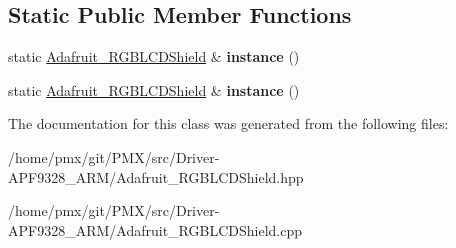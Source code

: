 \subsection*{Static Public Member Functions}
\begin{DoxyCompactItemize}
\item 
\mbox{\label{classAdafruit__RGBLCDShield_a5d6b24992e72f3beb5187b971eec3d42}} 
static \hyperlink{classAdafruit__RGBLCDShield}{Adafruit\+\_\+\+R\+G\+B\+L\+C\+D\+Shield} \& {\bfseries instance} ()
\item 
\mbox{\label{classAdafruit__RGBLCDShield_a5d6b24992e72f3beb5187b971eec3d42}} 
static \hyperlink{classAdafruit__RGBLCDShield}{Adafruit\+\_\+\+R\+G\+B\+L\+C\+D\+Shield} \& {\bfseries instance} ()
\end{DoxyCompactItemize}


The documentation for this class was generated from the following files\+:\begin{DoxyCompactItemize}
\item 
/home/pmx/git/\+P\+M\+X/src/\+Driver-\/\+A\+P\+F9328\+\_\+\+A\+R\+M/Adafruit\+\_\+\+R\+G\+B\+L\+C\+D\+Shield.\+hpp\item 
/home/pmx/git/\+P\+M\+X/src/\+Driver-\/\+A\+P\+F9328\+\_\+\+A\+R\+M/Adafruit\+\_\+\+R\+G\+B\+L\+C\+D\+Shield.\+cpp\end{DoxyCompactItemize}
